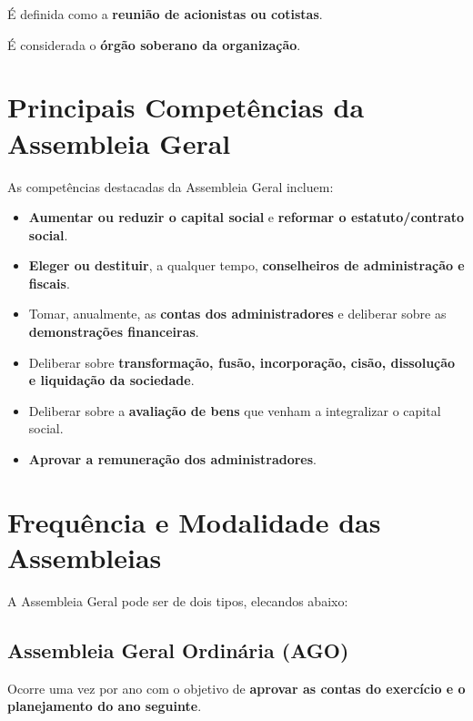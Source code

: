 \documentclass[
]{book}
\begin{document}
É definida como a \textbf{reunião de acionistas ou cotistas}.

É considerada o \textbf{órgão soberano da organização}.

\section{\texorpdfstring{\textbf{Principais Competências da Assembleia Geral}}{Principais Competências da Assembleia Geral}}\label{principais-competuxeancias-da-assembleia-geral}

As competências destacadas da Assembleia Geral incluem:

\begin{itemize}
\item
  \textbf{Aumentar ou reduzir o capital social} e \textbf{reformar o estatuto/contrato social}.
\item
  \textbf{Eleger ou destituir}, a qualquer tempo, \textbf{conselheiros de administração e fiscais}.
\item
  Tomar, anualmente, as \textbf{contas dos administradores} e deliberar sobre as \textbf{demonstrações financeiras}.
\item
  Deliberar sobre \textbf{transformação, fusão, incorporação, cisão, dissolução e liquidação da sociedade}.
\item
  Deliberar sobre a \textbf{avaliação de bens} que venham a integralizar o capital social.
\item
  \textbf{Aprovar a remuneração dos administradores}.
\end{itemize}

\section{\texorpdfstring{\textbf{Frequência e Modalidade das Assembleias}}{Frequência e Modalidade das Assembleias}}\label{frequuxeancia-e-modalidade-das-assembleias}

A Assembleia Geral pode ser de dois tipos, elecandos abaixo:

\subsection{\texorpdfstring{\textbf{Assembleia Geral Ordinária (AGO)}}{Assembleia Geral Ordinária (AGO)}}\label{assembleia-geral-ordinuxe1ria-ago}

Ocorre uma vez por ano com o objetivo de \textbf{aprovar as contas do exercício e o planejamento do ano seguinte}.
\end{document}
